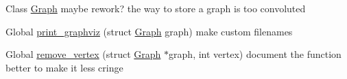 
\begin{DoxyRefList}
\item[Class \mbox{\hyperlink{structGraph}{Graph}} ]\label{todo__todo000001}%
%
maybe rework? the way to store a graph is too convoluted  
\item[Global \mbox{\hyperlink{graphs_8h_acd6b1d70c1ce8a211a16943ea4f55a0f}{print\+\_\+graphviz}} (struct \mbox{\hyperlink{structGraph}{Graph}} graph)]\label{todo__todo000002}%
%
make custom filenames  
\item[Global \mbox{\hyperlink{graphs_8h_a5be0e3005b2f6b61fd9b802ddbfe7305}{remove\+\_\+vertex}} (struct \mbox{\hyperlink{structGraph}{Graph}} $\ast$graph, int vertex)]\label{todo__todo000003}%
%
document the function better to make it less cringe 
\end{DoxyRefList}